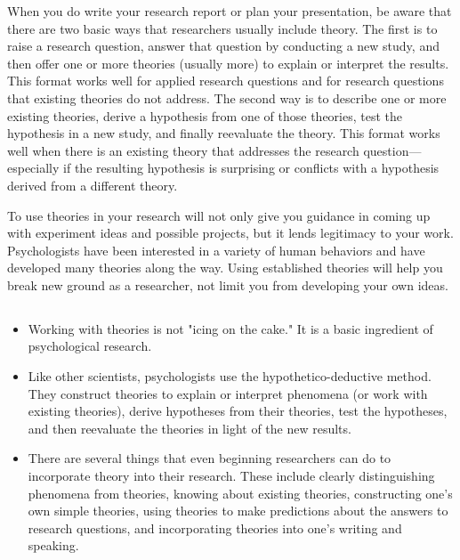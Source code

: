 When you do write your research report or plan your presentation, be aware that there are two basic ways that researchers usually include theory. The first is to raise a research question, answer that question by conducting a new study, and then offer one or more theories (usually more) to explain or interpret the results. This format works well for applied research questions and for research questions that existing theories do not address. The second way is to describe one or more existing theories, derive a hypothesis from one of those theories, test the hypothesis in a new study, and finally reevaluate the theory. This format works well when there is an existing theory that addresses the research question---especially if the resulting hypothesis is surprising or conflicts with a hypothesis derived from a different theory.

To use theories in your research will not only give you guidance in coming up with experiment ideas and possible projects, but it lends legitimacy to your work. Psychologists have been interested in a variety of human behaviors and have developed many theories along the way. Using established theories will help you break new ground as a researcher, not limit you from developing your own ideas.


\subsection{}

\begin{fullwidth}

\begin{itemize}

\item  Working with theories is not "icing on the cake." It is a basic ingredient of psychological research.

\item Like other scientists, psychologists use the hypothetico-deductive method. They construct theories to explain or interpret phenomena (or work with existing theories), derive hypotheses from their theories, test the hypotheses, and then reevaluate the theories in light of the new results.

\item There are several things that even beginning researchers can do to incorporate theory into their research. These include clearly distinguishing phenomena from theories, knowing about existing theories, constructing one's own simple theories, using theories to make predictions about the answers to research questions, and incorporating theories into one's writing and speaking.

\end{itemize}

\end{fullwidth}


